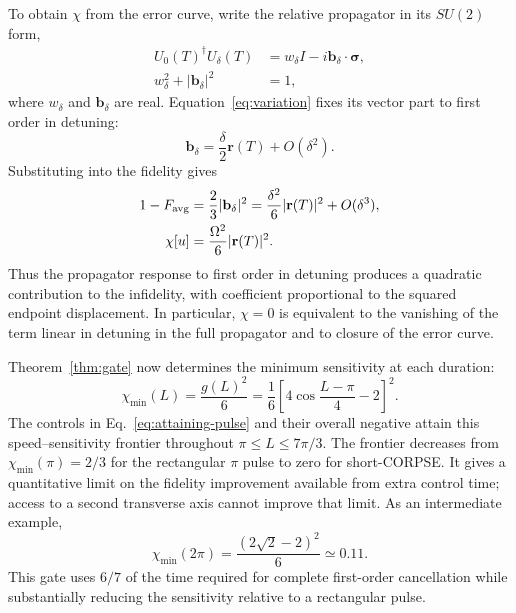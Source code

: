 \documentclass[12pt]{iopjournal}
\newcommand{\rvec}{\mathbf r}
\newcommand{\sigmavec}{\boldsymbol\sigma}
\begin{document}
To obtain $\chi$ from the error curve, write the relative propagator
in its $SU(2)$ form,
\begin{equation*}
 \begin{aligned}
 U_0(T)^\dagger U_\delta(T)
   &=w_\delta I-i\mathbf b_\delta\cdot\sigmavec,\\
 w_\delta^2+|\mathbf b_\delta|^2&=1,
 \end{aligned}
\end{equation*}
where $w_\delta$ and $\mathbf b_\delta$ are real.
Equation~\eqref{eq:variation} fixes its vector part to first order
in detuning:
\begin{equation*}
 \mathbf b_\delta=\frac{\delta}{2}\rvec(T)+O(\delta^2).
\end{equation*}
Substituting into the fidelity gives
\begin{equation}
 \begin{aligned}
 1-F_{\rm avg}&=\frac23|\mathbf b_\delta|^2
 =\frac{\delta^2}{6}|\rvec(T)|^2+O(\delta^3),\\
 \chi[u]&=\frac{\Omega^2}{6}|\rvec(T)|^2.
 \end{aligned}
 \label{eq:chi-curve}
\end{equation}
Thus the propagator response to first order in detuning produces a
quadratic contribution to the infidelity, with coefficient proportional
to the squared endpoint displacement. In particular, $\chi=0$ is
equivalent to the vanishing of the term linear in detuning in the
full propagator and to closure of the error curve.

Theorem~\ref{thm:gate} now determines the minimum sensitivity at
each duration:
\begin{equation}
 \boxed{\chi_{\min}(L)=\frac{g(L)^2}{6}
 =\frac16\left[4\cos\frac{L-\pi}{4}-2\right]^2.}
 \label{eq:main}
\end{equation}
The controls in Eq.~\eqref{eq:attaining-pulse} and their overall
negative attain this speed--sensitivity frontier throughout
$\pi\le L\le7\pi/3$. The frontier decreases from
$\chi_{\min}(\pi)=2/3$ for the rectangular $\pi$ pulse to zero for
short-CORPSE. It gives a quantitative limit on the fidelity improvement
available from extra control time; access to a second transverse
axis cannot improve that limit. As an intermediate example,
\begin{equation*}
 \chi_{\min}(2\pi)
 =\frac{(2\sqrt2-2)^2}{6}\simeq0.11.
\end{equation*}
This gate uses $6/7$ of the time required for complete first-order
cancellation while substantially reducing the sensitivity relative
to a rectangular pulse.
\end{document}
